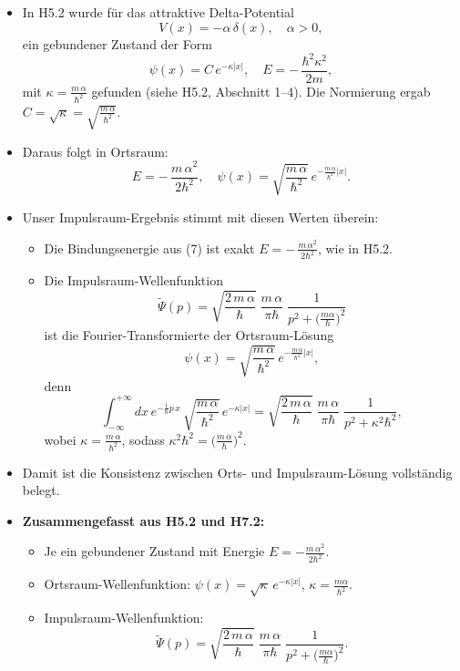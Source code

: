 \documentclass[12pt,a4paper]{scrartcl}
\begin{document}
\begin{itemize}
  \item In H5.2 wurde für das attraktive Delta-Potential
  \[
    V(x) = -\alpha\,\delta(x), \quad \alpha>0,
  \]
  ein gebundener Zustand der Form
  \[
    \psi(x) = C\,e^{-\kappa |x|}, \quad E = -\,\frac{\hbar^2 \kappa^2}{2m},
  \]
  mit $\kappa = \frac{m\,\alpha}{\hbar^2}$ gefunden (siehe H5.2, Abschnitt 1–4). Die Normierung ergab $C = \sqrt{\kappa} = \sqrt{\frac{m\,\alpha}{\hbar^2}}$.
  \item Daraus folgt in Ortsraum:
  \[
    E = -\,\frac{m\,\alpha^2}{2\hbar^2}, 
    \quad 
    \psi(x) = \sqrt{\frac{m\,\alpha}{\hbar^2}}\,e^{-\frac{m\,\alpha}{\hbar^2}|x|}.
  \]
  \item Unser Impulsraum-Ergebnis stimmt mit diesen Werten überein:
  \begin{itemize}
    \item Die Bindungsenergie aus (7) ist exakt $E = -\,\tfrac{m\,\alpha^2}{2\hbar^2}$, wie in H5.2.
    \item Die Impulsraum-Wellenfunktion
      \[
        \widetilde\Psi(p) 
        = \sqrt{\frac{2\,m\,\alpha}{\hbar}}\;\frac{m\,\alpha}{\pi\hbar}\;\frac{1}{p^2 + \bigl(\tfrac{m\alpha}{\hbar}\bigr)^2}
      \]
      ist die Fourier-Transformierte der Ortsraum-Lösung 
      \[
        \psi(x) = \sqrt{\frac{m\,\alpha}{\hbar^2}}\,e^{-\frac{m\,\alpha}{\hbar^2}|x|},
      \]
      denn
      \[
        \int_{-\infty}^{+\infty} dx\,e^{-\frac{\mathrm{i}}{\hbar}p\,x}\,\sqrt{\frac{m\,\alpha}{\hbar^2}}\,e^{-\kappa|x|}
        = \sqrt{\frac{2\,m\,\alpha}{\hbar}}\;\frac{m\,\alpha}{\pi\hbar}\;\frac{1}{p^2 + \kappa^2 \hbar^2},
      \]
      wobei $\kappa = \tfrac{m\,\alpha}{\hbar^2}$, sodass $\kappa^2 \hbar^2 = \bigl(\tfrac{m\,\alpha}{\hbar}\bigr)^2$.
  \end{itemize}
  \item Damit ist die Konsistenz zwischen Orts- und Impulsraum-Lösung vollständig belegt.
  \item \textbf{Zusammengefasst aus H5.2 und H7.2:}
  \begin{itemize}
    \item Je ein gebundener Zustand mit Energie $E = -\tfrac{m\,\alpha^2}{2\hbar^2}$.
    \item Ortsraum-Wellenfunktion: $\psi(x) = \sqrt{\kappa}\,e^{-\kappa|x|}$, $\kappa = \tfrac{m\alpha}{\hbar^2}$.
    \item Impulsraum-Wellenfunktion: 
      \[
        \widetilde\Psi(p) = \sqrt{\frac{2\,m\,\alpha}{\hbar}}\;\frac{m\,\alpha}{\pi\hbar}\;\frac{1}{p^2 + \bigl(\tfrac{m\alpha}{\hbar}\bigr)^2}.
      \]
  \end{itemize}
\end{itemize}
\end{document}
